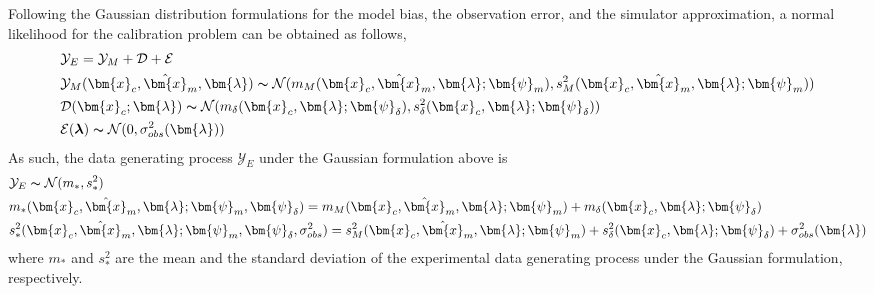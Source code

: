 Following the Gaussian distribution formulations for the model bias, the observation error, and the
simulator approximation, a normal likelihood for the calibration problem can be obtained as follows,
\begin{equation}
    \begin{split}
				& \mathcal{Y}_E = \mathcal{Y}_M + \mathcal{D} + \mathcal{E} \\
				& \mathcal{Y}_M (\bm{x}_c, \hat{\bm{x}}_m, \bm{\lambda}) \thicksim \mathcal{N}(m_M(\bm{x}_c, \hat{\bm{x}}_m, \bm{\lambda}; \bm{\psi}_{m}), s_M^2(\bm{x}_c, \hat{\bm{x}}_m, \bm{\lambda}; \bm{\psi}_{m})) \\
        & \mathcal{D}(\bm{x}_c; \bm{\lambda}) \thicksim \mathcal{N}(m_\delta(\bm{x}_c, \bm{\lambda}; \bm{\psi}_\delta), s_\delta^2(\bm{x}_c, \bm{\lambda}; \bm{\psi}_\delta)) \\
        & \mathcal{E}(\boldsymbol{\lambda}) \thicksim \mathcal{N}(0, \sigma_{obs}^2(\bm{\lambda})) \\
    \end{split}
\label{eq:bc_data_generating_models_gaussian}
\end{equation}
As such, the data generating process $\mathcal{Y}_E$ under the Gaussian formulation above is
\begin{equation}
	\begin{split}
		& \mathcal{Y}_E \thicksim \mathcal{N}(m_*, s^2_*) \\
		& m_*(\bm{x}_c, \hat{\bm{x}}_m, \bm{\lambda}; \bm{\psi}_m, \bm{\psi}_\delta) = m_M(\bm{x}_c, \hat{\bm{x}}_m, \bm{\lambda}; \bm{\psi}_m) + m_\delta(\bm{x}_c, \bm{\lambda}; \bm{\psi}_\delta) \\
		& s^2_*(\bm{x}_c, \hat{\bm{x}}_m, \bm{\lambda}; \bm{\psi}_m, \bm{\psi}_\delta, \sigma_{obs}^2) = s_M^2(\bm{x}_c, \hat{\bm{x}}_m, \bm{\lambda}; \bm{\psi}_{m}) + s_\delta^2(\bm{x}_c, \bm{\lambda}; \bm{\psi}_\delta) + \sigma_{obs}^2(\bm{\lambda})
	\end{split}
\label{eq:bc_data_model_gaussian}
\end{equation}
where $m_*$ and $s^2_*$ are the mean and the standard deviation of the experimental data generating process under the Gaussian formulation, respectively.


